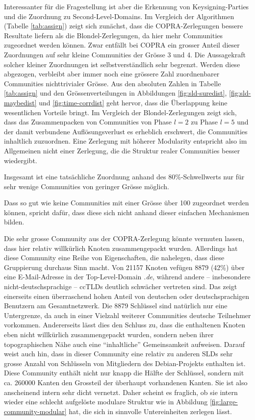 Interessanter f\"ur die Fragestellung ist aber die Erkennung von
Keysigning-Parties und die Zuordnung zu Second-Level-Domains. Im
Vergleich der Algorithmen (Tabelle \ref{tab:assign}) zeigt sich
zun\"achst, dass die COPRA-Zerlegungen bessere Resultate liefern als
die Blondel-Zerlegungen, da hier mehr Communities zugeordnet werden
k\"onnen. Zwar entf\"allt bei COPRA ein grosser Anteil dieser
Zuordnungen auf sehr kleine Communities der Gr\"osse 3 und 4. Die
Aussagekraft solcher kleiner Zuordnungen ist selbstverst\"andlich sehr
begrenzt. Werden diese abgezogen, verbleibt aber immer noch eine
gr\"ossere Zahl zuordnenbarer Communities nichttrivialer Gr\"osse. Aus
den absoluten Zahlen in Tabelle \ref{tab:assign} und den
Gr\"ossenverteilungen in Abbildungen \ref{fig:sld-suredist},
\ref{fig:sld-maybedist} und \ref{fig:time-corrdist} geht hervor, dass
die \"Uberlappung keine wesentlichen Vorteile bringt. Im Vergleich der
Blondel-Zerlegungen zeigt sich, dass das Zusammenpacken von
Communities von Phase $l=2$ zu Phase $l=5$ und der damit verbundene
Aufl\"osungsverlust es erheblich erschwert, die Communities inhaltlich
zuzuordnen. Eine Zerlegung mit h\"oherer Modularity entspricht also
im Allgemeinen nicht einer Zerlegung, die die Struktur realer
Communities besser wiedergibt. 

Insgesamt ist eine tats\"achliche Zuordnung anhand des
80\%-Schwellwerts nur f\"ur sehr wenige Communities von geringer
Gr\"osse m\"oglich. 

Dass so gut wie keine Communities mit einer
Gr\"osse \"uber 100 zugeordnet werden k\"onnen, spricht daf\"ur, dass
diese sich nicht anhand dieser einfachen Mechanismen bilden. 

Die sehr grosse Community aus der COPRA-Zerlegung k\"onnte vermuten
lassen, dass hier relativ willk\"urlich Knoten zusammengepackt
wurden. Allerdings hat diese Community eine Reihe von Eigenschaften,
die nahelegen, dass diese Gruppierung durchaus Sinn macht. Von 21157
Knoten vef\"ugen 8879 (42\%) \"uber eine E-Mail-Adresse in der
Top-Level-Domain \emph{.de}, w\"ahrend andere -- insbesondere
nicht-deutschsprachige -- ccTLDs deutlich schw\"acher vertreten
sind. Das zeigt einerseits einen \"uberraschend hohen Anteil von
deutschen oder deutschsprachigen Benutzern am Gesamtnetzwerk. Die 8879
Schl\"ussel sind nat\"urlich nur eine Untergrenze, da auch in einer
Vielzahl weiterer Communities deutsche Teilnehmer
vorkommen. Andererseits l\"asst dies den Schluss zu, dass die
enthaltenen Knoten eben nicht willk\"urlich zusammengepackt wurden,
sondern neben ihrer topographischen N\"ahe auch eine ``inhaltliche''
Gemeinsamkeit aufweisen. Darauf weist auch hin, dass in dieser
Community eine relativ zu anderen SLDs sehr grosse Anzahl von
Schl\"usseln von Mitgliedern des Debian-Projekts enthalten ist. Diese
Community enth\"alt nicht nur knapp die H\"alfte der Schl\"ussel,
sondern mit ca. 260000 Kanten den Grossteil der \"uberhaupt
vorhandenen Kanten. Sie ist also anscheinend intern sehr dicht
vernetzt. Daher scheint es fraglich, ob sie intern wieder eine
schlecht aufgel\"oste modulare Struktur wie in Abbildung
\ref{fig:large-community-modular} hat, die sich in sinnvolle
Untereinheiten zerlegen l\"asst.

